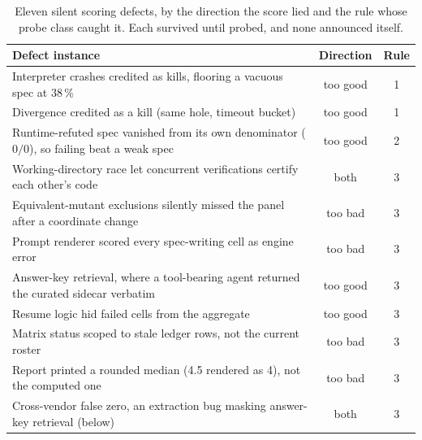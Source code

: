 \documentclass{article}
\begin{document}
\begin{table}[t]
\centering
\caption{Eleven silent scoring defects, by the direction the score lied
and the rule whose probe class caught it. Each survived until probed, and
none announced itself.}
\label{tab:defects}
\small
\begin{tabular}{p{8.6cm}cc}
\toprule
Defect instance & Direction & Rule \\
\midrule
Interpreter crashes credited as kills, flooring a vacuous spec at 38\,\% & too good & 1 \\
Divergence credited as a kill (same hole, timeout bucket) & too good & 1 \\
Runtime-refuted spec vanished from its own denominator ($0/0$), so failing beat a weak spec & too good & 2 \\
Working-directory race let concurrent verifications certify each other's code & both & 3 \\
Equivalent-mutant exclusions silently missed the panel after a coordinate change & too bad & 3 \\
Prompt renderer scored every spec-writing cell as engine error & too bad & 3 \\
Answer-key retrieval, where a tool-bearing agent returned the curated sidecar verbatim & too good & 3 \\
Resume logic hid failed cells from the aggregate & too good & 3 \\
Matrix status scoped to stale ledger rows, not the current roster & too bad & 3 \\
Report printed a rounded median (4.5 rendered as 4), not the computed one & too bad & 3 \\
Cross-vendor false zero, an extraction bug masking answer-key retrieval (below) & both & 3 \\
\bottomrule
\end{tabular}
\end{table}
\end{document}
